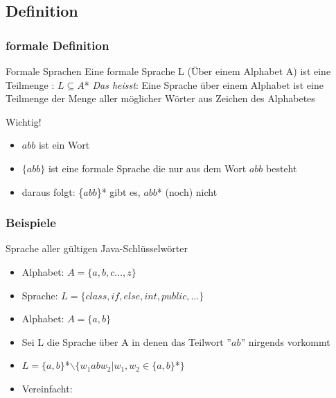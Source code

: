 \documentclass{beamer}
\begin{document}
\subsection[Definition]{Definition}
\begin{frame}
	\frametitle{formale Definition}
	\begin{block}{Formale Sprachen}
		Eine formale Sprache L (Über einem Alphabet A) ist eine
		Teilmenge : $L \subseteq A$*
	\newline 
	\newline 
	\emph{Das heisst}: Eine Sprache über einem Alphabet ist eine
Teilmenge der Menge aller möglicher Wörter aus Zeichen
des Alphabetes
	\end{block}
	\begin{block}{Wichtig!}
		\begin{itemize}[<+->]
			\item $abb$ ist ein Wort
			\item $\{abb\}$ ist eine formale Sprache die nur aus dem Wort $abb$ besteht
			\item daraus folgt: \{$abb$\}* gibt es, $abb$* (noch) nicht
		\end{itemize}
	\end{block}
\end{frame}

\begin{frame}
	\frametitle{Beispiele}
	\begin{example}
		Sprache aller gültigen Java-Schlüsselwörter
		\begin{itemize}[<+->]
			\item Alphabet: $A = \{a,b,c\ldots,z\}$
			\item Sprache: $L = \{class, if, else, int, public, \ldots\}$
		\end{itemize}
	\end{example}
	\begin{example}
		\begin{itemize}[<+->]
			\item Alphabet: $A = \{a,b\}$
			\item Sei L die Sprache über A in denen das Teilwort ''$ab$'' nirgends vorkommt
			\item $L = \{a,b\}$*$\backslash\{w_{1}abw_{2}|w_{1},w_{2}\in\{a,b\}$*$\}$
			\item Vereinfacht:
		\end{itemize}
	\end{example}
\end{frame}
\end{document}
